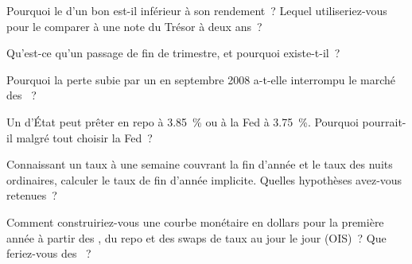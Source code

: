 \begin{interviewq}\label{iq:m2:money-markets:1}
Pourquoi le  d'un bon est-il inférieur à son rendement~? Lequel utiliseriez-vous
pour le comparer à une note du Trésor à deux ans~?
\end{interviewq}

\begin{interviewq}\label{iq:m2:money-markets:2}
Qu'est-ce qu'un passage de fin de trimestre, et pourquoi existe-t-il~?
\end{interviewq}

\begin{interviewq}\label{iq:m2:money-markets:3}
Pourquoi la perte subie par un  en septembre 2008 a-t-elle
interrompu le marché des ~?
\end{interviewq}

\begin{interviewq}\label{iq:m2:money-markets:4}
Un  d'État peut prêter en repo à 3.85~\% ou à la Fed à 3.75~\%.
Pourquoi pourrait-il malgré tout choisir la Fed~?
\end{interviewq}

\begin{interviewq}\label{iq:m2:money-markets:5}
Connaissant un taux à une semaine couvrant la fin d'année et le taux des nuits
ordinaires, calculer le taux de fin d'année implicite. Quelles hypothèses avez-vous retenues~?
\end{interviewq}

\begin{interviewq}\label{iq:m2:money-markets:6}
Comment construiriez-vous une courbe monétaire en dollars pour la première année à partir
des , du repo et des swaps de taux au jour le jour (OIS)~? Que feriez-vous des ~?
\end{interviewq}
